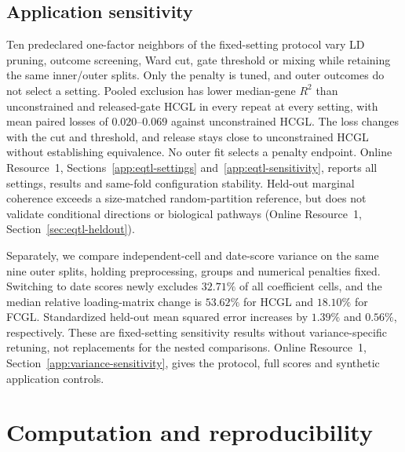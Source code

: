 \documentclass[lineno,pdflatex,sn-basic]{sn-jnl}
\theoremstyle{thmstyleone}
\begin{document}
\subsection{Application sensitivity}\label{sec:eqtl-sensitivity}

Ten predeclared one-factor neighbors of the fixed-setting protocol vary LD
pruning, outcome screening, Ward cut, gate threshold or mixing while retaining
the same inner/outer splits.
Only the penalty is tuned, and outer outcomes do not select a setting. Pooled
exclusion has lower median-gene $R^2$ than unconstrained and released-gate HCGL
in every repeat at every setting, with mean paired losses of $0.020$--$0.069$
against unconstrained HCGL. The loss changes with the cut and threshold, and
release stays close to unconstrained HCGL without establishing equivalence.
No outer fit selects a penalty endpoint. Online Resource~1,
Sections~\ref{app:eqtl-settings} and~\ref{app:eqtl-sensitivity}, reports all
settings, results and same-fold configuration stability. Held-out marginal
coherence exceeds a size-matched random-partition reference, but does not
validate conditional directions or biological pathways (Online Resource~1,
Section~\ref{sec:eqtl-heldout}).

Separately, we compare independent-cell and date-score variance on the same
nine outer splits, holding preprocessing, groups and numerical penalties fixed.
Switching to date scores newly excludes $32.71\%$ of all coefficient cells, and
the median relative loading-matrix change is $53.62\%$ for HCGL and $18.10\%$
for FCGL. Standardized held-out mean squared error increases by $1.39\%$ and
$0.56\%$, respectively. These are fixed-setting sensitivity results without
variance-specific retuning, not replacements for the nested comparisons.
Online Resource~1, Section~\ref{app:variance-sensitivity}, gives the protocol,
full scores and synthetic application controls.

\FloatBarrier
\section{Computation and reproducibility}\label{sec:reproduction}
\end{document}
